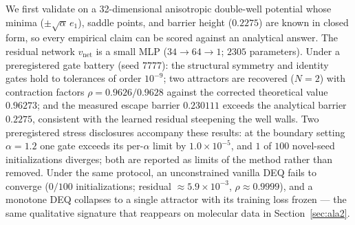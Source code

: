 We first validate on a 32-dimensional anisotropic double-well potential
whose minima ($\pm\sqrt{\alpha}\,e_1$), saddle points, and barrier height
($0.2275$) are known in closed form, so every empirical claim can be scored
against an analytical answer. The residual network $v_{\mathrm{net}}$ is a
small MLP ($34{\to}64{\to}1$; $2305$ parameters). Under a preregistered
gate battery (seed 7777): the structural symmetry and identity gates hold to
tolerances of order $10^{-9}$; two attractors are recovered
($N=2$) with contraction factors $\rho = 0.9626/0.9628$ against the
corrected theoretical value $0.96273$; and the measured escape barrier
$0.230111$ exceeds the analytical barrier $0.2275$, consistent with the
learned residual steepening the well walls. Two preregistered stress
disclosures accompany these results: at the boundary setting $\alpha=1.2$
one gate exceeds its per-$\alpha$ limit by $1.0\times10^{-5}$, and $1$ of
$100$ novel-seed initializations diverges; both are reported as limits of
the method rather than removed. Under the same protocol, an unconstrained
vanilla DEQ fails to converge ($0/100$ initializations; residual
$\approx5.9\times10^{-3}$, $\rho\approx0.9999$), and a monotone DEQ
collapses to a single attractor with its training loss frozen — the same
qualitative signature that reappears on molecular data in
Section~\ref{sec:ala2}.

